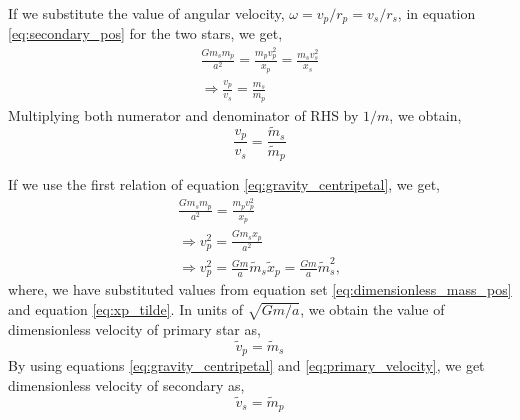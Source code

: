 \documentclass[a4paper]{article}
\begin{document}
\begin{enumerate} [label*=\textbf{(\alph*)}]
				If we substitute the value of angular velocity, \(\omega =  v_p/r_p = v_s/r_s\), in equation \ref{eq:secondary_pos} for the two stars, we get,
				\begin{equation}
					\begin{gathered}
						\frac{G m_s m_p}{a^2} = \frac{m_p v_p^2}{x_p} = \frac{m_s v_s^2}{x_s} \\
						\Rightarrow \frac{v_p}{v_s} = \frac{m_s}{m_p}
					\end{gathered}
					\label{eq:gravity_centripetal}
				\end{equation}
				Multiplying both numerator and denominator of RHS by \(1/m\), we obtain,
				\begin{equation}
					\frac{v_p}{v_s} = \frac{\tilde{m}_s}{\tilde{m}_p}
					\label{eq:velocity_mass_relation}
				\end{equation}
				
				If we use the first relation of equation \ref{eq:gravity_centripetal}, we get,
				\begin{equation}
					\begin{gathered}
						\frac{G m_s m_p}{a^2} = \frac{m_p v_p^2}{x_p} \\
						\Rightarrow v_p^2 = \frac{G m_s x_p}{a^2} \\
						\Rightarrow v_p^2 = \frac{Gm}{a} \tilde{m}_s \tilde{x}_p = \frac{Gm}{a} \tilde{m}_s^2,
					\end{gathered}
				\end{equation}
				where, we have substituted values from equation set \ref{eq:dimensionless_mass_pos} and equation \ref{eq:xp_tilde}. In units of \(\sqrt{Gm/a}\), we obtain the value of dimensionless velocity of primary star as,
					\begin{equation}
						\tilde{v}_p = \tilde{m}_s
						\label{eq:primary_velocity}
					\end{equation}
				By using equations \ref{eq:gravity_centripetal} and \ref{eq:primary_velocity}, we get dimensionless velocity of secondary as,
					\begin{equation}
						\tilde{v}_s = \tilde{m}_p
						\label{eq:secondary_velocity}
					\end{equation}
				

\end{enumerate}
\end{document}
